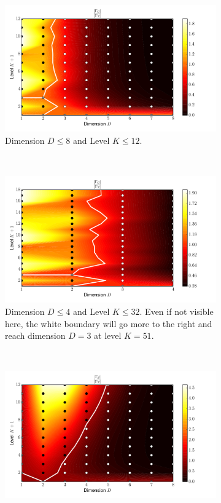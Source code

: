 \documentclass[a4paper,10pt]{article}
\begin{document}
\begin{figure}
  \begin{subfigure}[b]{\linewidth}
    \centering
    \includegraphics[width=0.8\linewidth]{./img/gk_hermitephy_ratio.pdf}
    \caption{Dimension $D \leq 8$ and Level $K \leq 12$.}
    \label{fig:gk_hermitephy_ratio}
  \end{subfigure} \\
  \begin{subfigure}[b]{\linewidth}
    \centering
    \includegraphics[width=0.8\linewidth]{./img/gk_hermitephy_ratio_large.pdf}
    \caption{Dimension $D \leq 4$ and Level $K \leq 32$.
    Even if not visible here, the white boundary will go more to the right and
    reach dimension $D = 3$ at level $K = 51$.}
    \label{fig:gk_hermitephy_ratio_large}
  \end{subfigure} \\
  \begin{subfigure}[b]{\linewidth}
    \centering
    \includegraphics[width=0.8\linewidth]{./img/smol_hermitephy_ratio.pdf}

\end{subfigure}
\end{figure}
\end{document}
